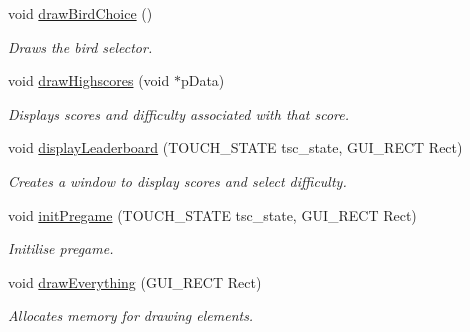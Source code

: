 \begin{DoxyCompactItemize}
void \hyperlink{group___flappy___bird_ga9190fcf2aa0aeea553dcad1bdd5a4a46}{draw\+Bird\+Choice} ()
\begin{DoxyCompactList}\small\item\em Draws the bird selector. \end{DoxyCompactList}\item 
void \hyperlink{group___flappy___bird_ga30accaeacb835fd678ae029b46c79049}{draw\+Highscores} (void $\ast$p\+Data)
\begin{DoxyCompactList}\small\item\em Displays scores and difficulty associated with that score. \end{DoxyCompactList}\item 
void \hyperlink{group___flappy___bird_gabfcc5324c3f7bb7ce59a6e462a1ebd42}{display\+Leaderboard} (T\+O\+U\+C\+H\+\_\+\+S\+T\+A\+TE tsc\+\_\+state, G\+U\+I\+\_\+\+R\+E\+CT Rect)
\begin{DoxyCompactList}\small\item\em Creates a window to display scores and select difficulty. \end{DoxyCompactList}\item 
void \hyperlink{group___flappy___bird_ga332be568448526bd288ccd321978fb1b}{init\+Pregame} (T\+O\+U\+C\+H\+\_\+\+S\+T\+A\+TE tsc\+\_\+state, G\+U\+I\+\_\+\+R\+E\+CT Rect)
\begin{DoxyCompactList}\small\item\em Initilise pregame. \end{DoxyCompactList}\item 
void \hyperlink{group___flappy___bird_ga5b822966aed05dfd5193feab196a3239}{draw\+Everything} (G\+U\+I\+\_\+\+R\+E\+CT Rect)
\begin{DoxyCompactList}\small\item\em Allocates memory for drawing elements. \end{DoxyCompactList}\end{DoxyCompactItemize}
